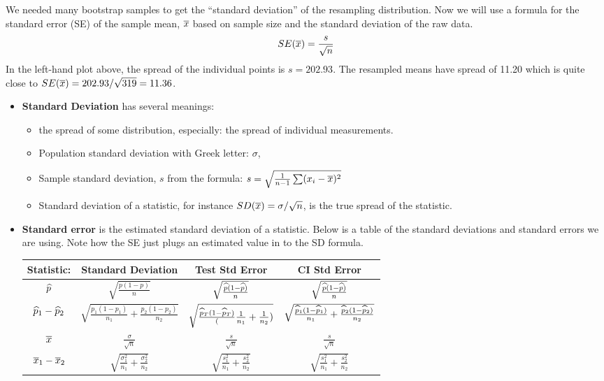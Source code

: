 We needed many bootstrap samples to get  the
``standard deviation'' of the resampling distribution.  Now we will use a
formula for the standard error (SE) of the sample mean, $\overline{x}$ based on
sample size and the standard deviation of the raw data.  
$$SE(\overline{x}) = \frac{s}{\sqrt{n}}$$
In the left-hand plot above, the spread of the individual points is $s
= 202.93$. The resampled means have spread of 11.20 which is quite
close to $SE(\overline{x}) = 202.93/\sqrt{319} = 11.36$.  
\begin{itemize}
\item {\bf Standard Deviation} has several meanings:
  \begin{itemize}
    \item the spread of some  distribution, especially: the spread of
      individual  measurements.
    \item Population standard deviation with  Greek letter: $\sigma$,
    \item Sample standard deviation, $s$ from the formula: $s =
      \sqrt{\frac{1}{n-1}\sum(x_i - \overline{x})^2}$
    \item  Standard deviation of a statistic, for instance  $SD(\overline{x})
      =\sigma/\sqrt{n}$, is the true spread of the statistic.
  \end{itemize}

\item {\bf Standard error} is the estimated standard deviation of a
  statistic. Below is a table of the  standard deviations and standard
  errors we  are using.  Note how the SE just plugs an estimated value
  in to the SD formula.\\
  \begin{center}
  \begin{tabular}{|c|c|c|c|}\hline
    Statistic: & Standard Deviation & Test Std Error& CI Std Error\\ \hline
    $\widehat{p}$ & $\sqrt{\frac{p(1-p)}{n}}$ & $\sqrt{\frac{\widehat{p}(1-\widehat{p})}{n}}$& $\sqrt{\frac{\widehat{p}(1-\widehat{p})}{n}}$\\
    \hline
    $\widehat{p}_1 - \widehat{p}_2$&  $\sqrt{\frac{p_1(1-p_1)}{n_1}
      +\frac{p_2(1-p_2)}{n_2} }$ &
       $\sqrt{\frac{\widehat{p}_T(1-\widehat{p}_T)}(\frac{1}{n_1} + \frac{1}{n_2} )}$
       & $\sqrt{\frac{\widehat{p}_1(1-\widehat{p}_1)}{n_1}
          +\frac{\widehat{p}_2(1-\widehat{p}_2)}{n_2} }$ \\ \hline
     $\overline{x}$ & $\frac{\sigma}{\sqrt{n}}$ & $\frac{s}{\sqrt{n}}$& $\frac{s}{\sqrt{n}}$ \\\hline
     $\overline{x}_1 - \overline{x}_2$ & $\sqrt{\frac{\sigma_1^2}{n_1} +\frac{\sigma_2^2}{n_2}} $
      & $\sqrt{\frac{s_1^2}{n_1} +\frac{s_2^2}{n_2}} $  
      & $\sqrt{\frac{s_1^2}{n_1} +\frac{s_2^2}{n_2}} $  \\ \hline
  \end{tabular}\vspace{.1in}    
  \end{center}
\end{itemize}

